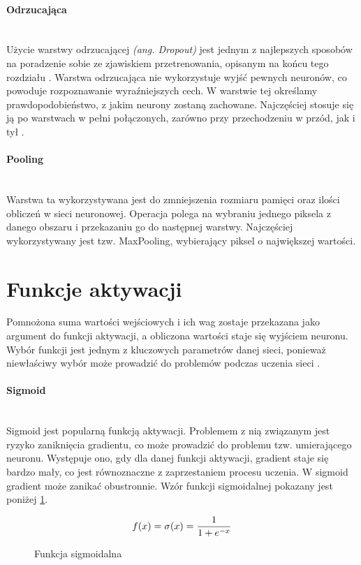 \paragraph{Odrzucająca} \mbox{}\\
Użycie warstwy odrzucającej \textit{(ang. Dropout)} jest jednym z najlepszych sposobów
na poradzenie sobie ze zjawiskiem przetrenowania, opisanym na końcu tego rozdziału
\cite{DropoutPreventOverfit}. Warstwa odrzucająca nie wykorzystuje wyjść pewnych neuronów,
co powoduje rozpoznawanie wyraźniejszych cech. W warstwie tej określamy prawdopodobieństwo,
z jakim neurony zostaną zachowane. Najczęściej stosuje się ją po warstwach w pełni
połączonych, zarówno przy przechodzeniu w przód, jak i tył \cite{DropConnect}.

\paragraph{Pooling} \mbox{}\\
Warstwa ta wykorzystywana jest do zmniejszenia rozmiaru pamięci oraz ilości obliczeń
w sieci neuronowej. Operacja polega na wybraniu jednego piksela z danego obszaru i przekazaniu
go do następnej warstwy. Najczęściej wykorzystywany jest tzw. MaxPooling, wybierający
piksel o największej wartości.

\section{Funkcje aktywacji}

Pomnożona suma wartości wejściowych i ich wag zostaje przekazana
jako argument do funkcji aktywacji, a obliczona wartości staje się wyjściem neuronu.
Wybór funkcji jest jednym z kluczowych parametrów danej sieci, ponieważ niewłaściwy wybór
może prowadzić do problemów podczas uczenia sieci \cite{activationFunctions, activationFunctionsV2}.

\paragraph{Sigmoid} \mbox{}\\
Sigmoid jest popularną funkcją aktywacji. Problemem z nią związanym
jest ryzyko zaniknięcia gradientu, co może prowadzić do problemu tzw. umierającego
neuronu. Występuje ono, gdy dla danej funkcji aktywacji,
gradient staje się bardzo mały, co jest równoznaczne z zaprzestaniem procesu uczenia.
W sigmoid gradient może zanikać obustronnie. Wzór funkcji sigmoidalnej pokazany jest poniżej \ref{eq:sigmoid}.
\begin{figure}[h!]
\renewcommand{\figurename}{Wzór}%
\begin{equation*}
f(x) = \sigma(x) = \frac{1}{1 + e^{-x}} \\
\end{equation*}
\caption{Funkcja sigmoidalna}
\label{eq:sigmoid}
\end{figure}

